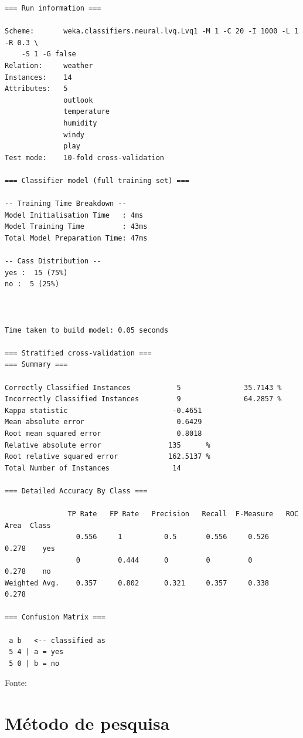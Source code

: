 \vspace{0.5cm}
\begin{lstlisting}[caption=Exemplo de saída de uma execução do WEKA, label=lst:prop_weka_out]
=== Run information ===

Scheme:       weka.classifiers.neural.lvq.Lvq1 -M 1 -C 20 -I 1000 -L 1 -R 0.3 \
    -S 1 -G false
Relation:     weather
Instances:    14
Attributes:   5
              outlook
              temperature
              humidity
              windy
              play
Test mode:    10-fold cross-validation

=== Classifier model (full training set) ===

-- Training Time Breakdown --
Model Initialisation Time   : 4ms
Model Training Time         : 43ms
Total Model Preparation Time: 47ms

-- Cass Distribution --
yes :  15 (75%)
no :  5 (25%)



Time taken to build model: 0.05 seconds

=== Stratified cross-validation ===
=== Summary ===

Correctly Classified Instances           5               35.7143 %
Incorrectly Classified Instances         9               64.2857 %
Kappa statistic                         -0.4651
Mean absolute error                      0.6429
Root mean squared error                  0.8018
Relative absolute error                135      %
Root relative squared error            162.5137 %
Total Number of Instances               14

=== Detailed Accuracy By Class ===

               TP Rate   FP Rate   Precision   Recall  F-Measure   ROC Area  Class
                 0.556     1          0.5       0.556     0.526      0.278    yes
                 0         0.444      0         0         0          0.278    no
Weighted Avg.    0.357     0.802      0.321     0.357     0.338      0.278

=== Confusion Matrix ===

 a b   <-- classified as
 5 4 | a = yes
 5 0 | b = no
\end{lstlisting}
\vspace{0.25cm}
\centerline{Fonte: \cite{Hall2009}}
\vspace{0.5cm}

\iffalse

\section{Método de pesquisa}

